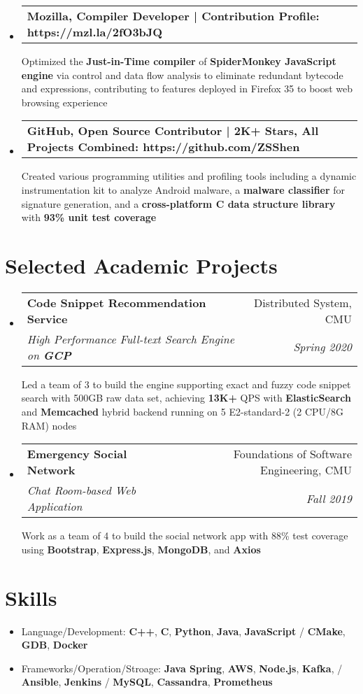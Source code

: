 \documentclass[letterpaper,11pt]{article}
\makeatletter
\newcommand{\resumeSubheading}[4]{
  \vspace{-1pt}\item
    \begin{tabular*}{0.97\textwidth}{l@{\extracolsep{\fill}}r}
      \textbf{#1} & #2 \\
      \textit{\small#3} & \textit{\small #4} \\
    \end{tabular*}\vspace{-5pt}
}
\newcommand{\openSourceSubheading}[4]{
  \vspace{-1pt}\item
    \begin{tabular*}{0.97\textwidth}{l@{\extracolsep{\fill}}r}
     \vspace{4pt} \textbf{#1} & #2 \\
    \end{tabular*}\vspace{-5pt}
}
\newcommand{\resumeSubHeadingListStart}{\begin{itemize}[leftmargin=*]}
\newcommand{\resumeSubHeadingListEnd}{\end{itemize}}
\makeatother
\begin{document}
\resumeSubHeadingListStart
\openSourceSubheading
{Mozilla, {\normalfont Compiler Developer} | {\normalfont Contribution Profile: https://mzl.la/2fO3bJQ}}{}
{}{}

\small Optimized the \textbf{Just-in-Time compiler} of \textbf{SpiderMonkey JavaScript engine} via control and data flow analysis to eliminate redundant bytecode and expressions, contributing to features deployed in Firefox 35 to boost web browsing experience

\openSourceSubheading
{GitHub, {\normalfont Open Source Contributor} | {\normalfont \textbf{2K+} Stars, All Projects Combined: https://github.com/ZSShen} }{}
{}{}

\small Created various programming utilities and profiling tools including a dynamic instrumentation kit to analyze Android malware, a \textbf{malware classifier} for signature generation, and a \textbf{cross-platform C data structure library} with \textbf{93\% unit test coverage}


\resumeSubHeadingListEnd

\section{Selected Academic Projects}

\resumeSubHeadingListStart

\resumeSubheading
{Code Snippet Recommendation Service}{Distributed System, CMU}
{High Performance Full-text Search Engine on \textbf{GCP} }{Spring 2020}

\vspace{3pt} \small {Led a team of 3 to build the engine supporting exact and fuzzy code snippet search with 500GB raw data set, achieving \textbf{13K+} QPS with \textbf{ElasticSearch} and \textbf{Memcached} hybrid backend running on 5 E2-standard-2 (2 CPU/8G RAM) nodes}

\resumeSubheading
{Emergency Social Network}{Foundations of Software Engineering, CMU}
{Chat Room-based Web Application}{Fall 2019}

\vspace{3pt}\small{Work as a team of 4 to build the social network app with 88\% test coverage using \textbf{Bootstrap}, \textbf{Express.js}, \textbf{MongoDB}, and \textbf{Axios}}


\resumeSubHeadingListEnd

%
\section{Skills}
\resumeSubHeadingListStart
\item{
      Language/Development: \textbf{C++}, \textbf{C}, \textbf{Python}, \textbf{Java}, \textbf{JavaScript} / \textbf{CMake}, \textbf{GDB}, \textbf{Docker}
}
\vspace{-3pt}
\item{
      Frameworks/Operation/Stroage: \textbf{Java Spring}, \textbf{AWS}, \textbf{Node.js}, \textbf{Kafka}, / \textbf{Ansible}, \textbf{Jenkins} / \textbf{MySQL}, \textbf{Cassandra}, \textbf{Prometheus}
}
\resumeSubHeadingListEnd


\end{document}
